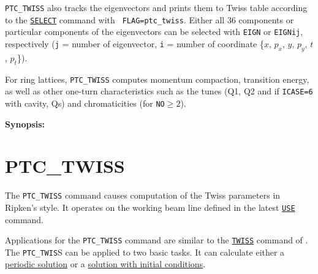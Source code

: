{\tt PTC\_TWISS} also tracks the eigenvectors and prints them to Twiss table
according to the \hyperref[sec:select]{\tt SELECT} command  with {\tt
  FLAG=ptc\_twiss}. 
Either all 36 components or particular components of the eigenvectors
can be selected with {\tt EIGN} or {\tt EIGNij}, respectively ({\tt j} = number of
eigenvector, {\tt i} = number of coordinate \{$x$, $p_x$, $y$, $p_y$,
$t$, $p_t$\}). 

For ring lattices, {\tt PTC\_TWISS} computes momentum compaction, transition
energy, as well as other one-turn characteristics such as the tunes
(Q1, Q2 and if {\tt ICASE=6} with cavity, Qs) and chromaticities (for
{\tt NO}$\geq 2$).  

{\bf Synopsis:}

\section{PTC\_TWISS}
\label{sec:ptc-twiss}
 
The {\tt PTC\_TWISS} command causes computation of the Twiss
parameters in Ripken's style. It operates on the working beam line
defined in the latest \hyperref[sec:use]{\tt USE} command. 

Applications for the {\tt PTC\_TWISS} command are similar to the
\hyperref[chap:twiss]{\tt TWISS} command of \madx. 
The {\tt PTC\_TWIS}S can be applied to two basic tasks. It can calculate either a
\hyperref[sec:ptc-twiss-periodic]{periodic solution} or a
\hyperref[sec:ptc-twiss-sol-initial-cond]{solution with initial conditions}. 

